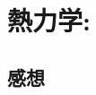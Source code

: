 \documentclass[../../sp_2014.tex]{subfiles}
\begin{document}
\section{熱力学:}


\subsection*{感想}
\end{document}
